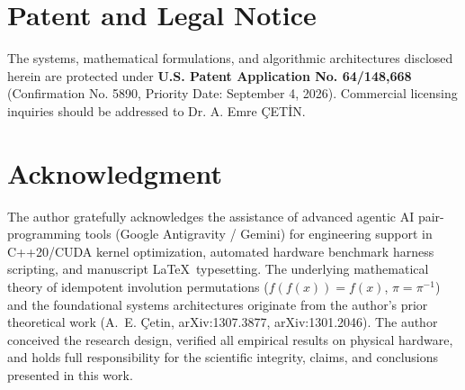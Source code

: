 \documentclass[journal,10pt,twocolumn]{article}
\begin{document}
\begin{table}[h]
\centering
\caption{Performance Comparison: Naive $\mathcal{O}(N^2)$ vs IdemSpatial $\mathcal{O}(N)$}
\label{tab:perf}
\end{table}

\section{Patent and Legal Notice}
The systems, mathematical formulations, and algorithmic architectures disclosed herein are protected under \textbf{U.S. Patent Application No. 64/148,668} (Confirmation No. 5890, Priority Date: September 4, 2026). Commercial licensing inquiries should be addressed to Dr. A. Emre \c{C}ET\.{I}N.

\section*{Acknowledgment}
The author gratefully acknowledges the assistance of advanced agentic AI pair-programming tools (Google Antigravity / Gemini) for engineering support in C++20/CUDA kernel optimization, automated hardware benchmark harness scripting, and manuscript \LaTeX\ typesetting. The underlying mathematical theory of idempotent involution permutations ($f(f(x))=f(x)$, $\pi = \pi^{-1}$) and the foundational systems architectures originate from the author's prior theoretical work (A.~E. {\c{C}}etin, arXiv:1307.3877, arXiv:1301.2046). The author conceived the research design, verified all empirical results on physical hardware, and holds full responsibility for the scientific integrity, claims, and conclusions presented in this work.
\end{document}
